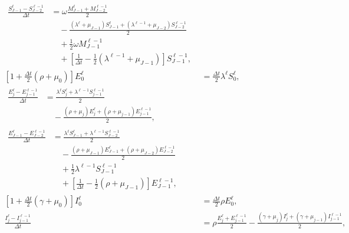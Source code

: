 \documentclass{jpmarticle}
\let\subequationsorig\subequations%
\let\endsubequationsorig\endsubequations%
\renewenvironment{subequations}{
  \subequationsorig
  \renewcommand{\theequation}{\theparentequation.\arabic{equation}}
}{
  \endsubequationsorig
}
\begin{document}
\begin{subequations}
\begin{align}
    \\
    \begin{split}
      \frac{S_{J - 1}^{\ell} - S_{J - 2}^{\ell - 1}}{\Delta t} &=
      \omega \frac{M_{J - 1}^{\ell} + M_{J - 2}^{\ell - 1}}{2}
      \\ & \quad {}
      - \frac{(\lambda^{\ell} + \mu_{J - 1}) S_{J - 1}^{\ell}
        + (\lambda^{\ell - 1} + \mu_{J - 2}) S_{J - 2}^{\ell - 1}}
      {2}
      \\ & \quad {}
      + \frac{1}{2} \omega M_{J - 1}^{\ell - 1}
      \\ & \quad {}
      + \left[
        \frac{1}{\Delta t} - \frac{1}{2} (\lambda^{\ell - 1} + \mu_{J - 1})
      \right] S_{J - 1}^{\ell - 1},
    \end{split}
    \\
    \left[1 + \frac{\Delta t}{2} (\rho + \mu_0)\right] E_0^{\ell}
    &= \frac{\Delta t}{2} \lambda^{\ell} S_0^{\ell},
    \\
    \begin{split}
      \frac{E_j^{\ell} - E_{j - 1}^{\ell - 1}}{\Delta t} &=
      \frac{\lambda^{\ell} S_j^{\ell} + \lambda^{\ell - 1} S_{j - 1}^{\ell - 1}}{2}
      \\ & \quad {}
      - \frac{(\rho + \mu_j) E_j^{\ell}
        + (\rho + \mu_{j - 1}) E_{j - 1}^{\ell - 1}}{2},
    \end{split}
    \\
    \begin{split}
      \frac{E_{J - 1}^{\ell} - E_{J - 2}^{\ell - 1}}{\Delta t} &=
      \frac{\lambda^{\ell} S_{J - 1}^{\ell}
        + \lambda^{\ell - 1} S_{J - 2}^{\ell - 1}}{2}
      \\ & \quad {}
      - \frac{(\rho + \mu_{J - 1}) E_{J - 1}^{\ell}
        + (\rho + \mu_{J - 2}) E_{J - 2}^{\ell - 1}}{2}
      \\ & \quad {}
      + \frac{1}{2} \lambda^{\ell - 1} S_{J - 1}^{\ell - 1}
      \\ & \quad {}
      + \left[
        \frac{1}{\Delta t} - \frac{1}{2} (\rho + \mu_{J - 1})
      \right] E_{J - 1}^{\ell - 1},
    \end{split}
    \\
    \left[1 + \frac{\Delta t}{2} (\gamma + \mu_0)\right] I_0^{\ell}
    &= \frac{\Delta t}{2} \rho E_0^{\ell},
    \\
    \frac{I_j^{\ell} - I_{j - 1}^{\ell - 1}}{\Delta t} &=
    \rho \frac{E_j^{\ell} + E_{j - 1}^{\ell - 1}}{2}
    - \frac{(\gamma + \mu_j) I_j^{\ell}
      + (\gamma + \mu_{j - 1}) I_{j - 1}^{\ell - 1}}{2},

\end{align}
\end{subequations}
\end{document}
